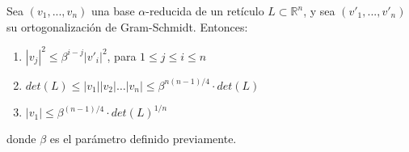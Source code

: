     \begin{proposicion} \cite{artLLL}
        Sea $(v_{1}, ... , v_{n})$ una base $\alpha$-reducida de un retículo $L \subset \mathbb{R}^{n}$, y sea $(v'_{1}, ... , v'_{n})$ su ortogonalización de Gram-Schmidt. Entonces:
        \begin{enumerate}
            \item $\left| v_{j} \right|^{2} \leq \beta^{i-j} \left| v'_{i} \right|^{2}$, para $1 \leq j \leq i \leq n$
            \item $det(L) \leq \left| v_{1} \right| \left| v_{2} \right| \hdots \left| v_{n} \right| \leq \beta^{n(n-1)/4} \cdot det(L)$
            \item $\left| v_{1} \right| \leq \beta^{(n-1)/4} \cdot det(L)^{1/n}$
        \end{enumerate}
        donde $\beta$ es el parámetro definido previamente.
    \end{proposicion}

